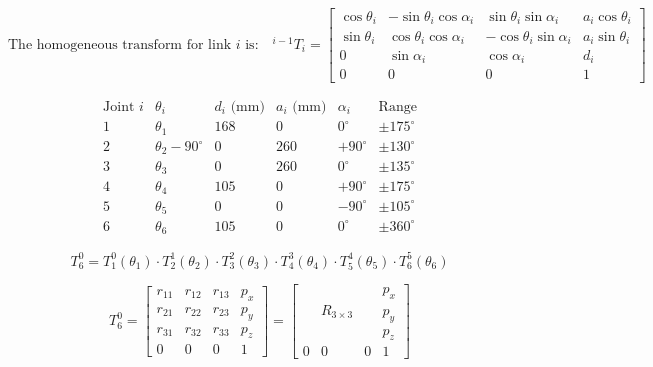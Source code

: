 \documentclass[border=10pt, convert={png300}]{standalone}
\begin{document}

\[
\text{The homogeneous transform for link } i \text{ is:} 
\quad ^{i-1}T_i = 
\begin{bmatrix}
\cos\theta_i & -\sin\theta_i \cos\alpha_i & \sin\theta_i \sin\alpha_i & a_i \cos\theta_i \\
\sin\theta_i & \cos\theta_i \cos\alpha_i & -\cos\theta_i \sin\alpha_i & a_i \sin\theta_i \\
0 & \sin\alpha_i & \cos\alpha_i & d_i \\
0 & 0 & 0 & 1
\end{bmatrix}
\]


\[
\begin{array}{c|cccc|c}
\text{Joint } i & \theta_i & d_i \text{ (mm)} & a_i \text{ (mm)} & \alpha_i & \text{Range} \\ \hline
1 & \theta_1 & 168 & 0 & 0^\circ & \pm175^\circ \\
2 & \theta_2 - 90^\circ & 0 & 260 & +90^\circ & \pm130^\circ \\
3 & \theta_3 & 0 & 260 & 0^\circ & \pm135^\circ \\
4 & \theta_4 & 105 & 0 & +90^\circ & \pm175^\circ \\
5 & \theta_5 & 0 & 0 & -90^\circ & \pm105^\circ \\
6 & \theta_6 & 105 & 0 & 0^\circ & \pm360^\circ
\end{array}
\]


\[
T^0_6 = T^0_1(\theta_1) \cdot T^1_2(\theta_2) \cdot T^2_3(\theta_3) \cdot T^3_4(\theta_4) \cdot T^4_5(\theta_5) \cdot T^5_6(\theta_6)
\]

\bigskip

\[
T^0_6 = 
\begin{bmatrix}
r_{11} & r_{12} & r_{13} & p_x \\
r_{21} & r_{22} & r_{23} & p_y \\
r_{31} & r_{32} & r_{33} & p_z \\
0 & 0 & 0 & 1
\end{bmatrix}
=
\begin{bmatrix}
& & & p_x \\
& R_{3\times3} & & p_y \\
& & & p_z \\
0 & 0 & 0 & 1
\end{bmatrix}
\]
\end{document}
